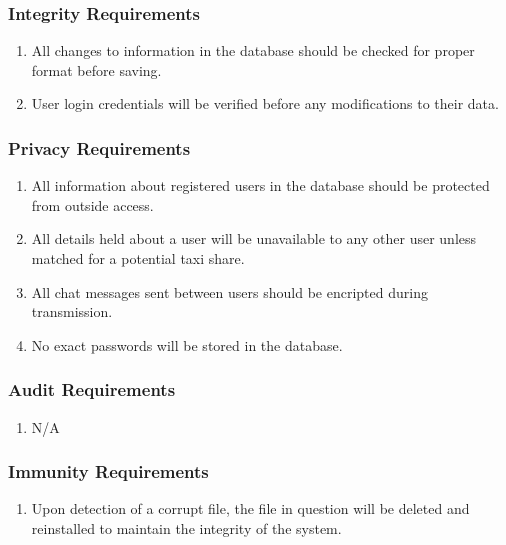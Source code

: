 \documentclass[]{article}
\begin{document}
\subsubsection{Integrity Requirements}
\label{ssub:integrity_requirements}
\begin{enumerate}[{SR}1. ]
	\item All changes to information in the database should be checked for proper format before saving.
	\item User login credentials will be verified before any modifications to their data.
\end{enumerate}

\subsubsection{Privacy Requirements}
\label{ssub:privacy_requirements}
\begin{enumerate}[{SR}1. ]
	\item All information about registered users in the database should be protected from outside access.
	\item All details held about a user will be unavailable to any other user unless matched for a potential taxi share.
	\item All chat messages sent between users should be encripted during transmission.
	\item No exact passwords will be stored in the database.
\end{enumerate}

\subsubsection{Audit Requirements}
\label{ssub:audit_requirements}
\begin{enumerate}[{SR}1. ]
	\item N/A
\end{enumerate}

\subsubsection{Immunity Requirements}
\label{ssub:immunity_requirements}
\begin{enumerate}[{SR}1. ]
	\item Upon detection of a corrupt file, the file in question will be deleted and reinstalled to maintain the integrity of the system.
\end{enumerate}
\end{document}
